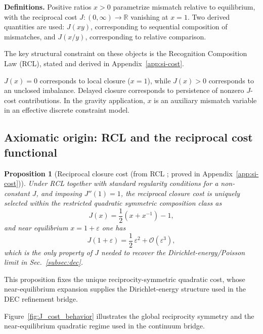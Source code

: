 \documentclass[entropy,article,submit,pdftex,moreauthors]{Definitions/mdpi}
\newtheorem{propositionX}[theoremX]{Proposition}
\begin{document}
\textbf{Definitions.} Positive ratios \(x>0\) parametrize mismatch relative to equilibrium, with the reciprocal cost \(J:(0,\infty)\to\mathbb{R}\) vanishing at \(x=1\). Two derived quantities are used: \(J(xy)\), corresponding to sequential composition of mismatches, and \(J(x/y)\), corresponding to relative comparison.

The key structural constraint on these objects is the Recognition Composition Law (RCL), stated and derived in Appendix~\ref{app:si-cost}.

\(J(x)=0\) corresponds to local closure (\(x=1\)), while \(J(x)>0\) corresponds to an unclosed imbalance. Delayed closure corresponds to persistence of nonzero \(J\)-cost contributions. In the gravity application, \(x\) is an auxiliary mismatch variable in an effective discrete constraint model.

\subsection{Axiomatic origin: RCL and the reciprocal cost functional}
\label{subsec:cost}

\begin{propositionX}
[Reciprocal closure cost (from RCL \cite{pardoguerra2026,washburn2026ratio}; proved in Appendix~\ref{app:si-cost})]
\label{dr:J}
Under RCL together with standard regularity conditions for a non-constant \(J\), and imposing \(J''(1)=1\), the reciprocal closure cost is uniquely selected within the restricted quadratic symmetric composition class as 
\begin{equation}
 J(x)=\frac12\left(x+x^{-1}\right)-1,
  \label{eq:J-closed-form-main}
\end{equation}
and near equilibrium \(x=1+\varepsilon\) one has
\begin{equation}
  J(1+\varepsilon)=\frac12\,\varepsilon^2+\mathcal{O}(\varepsilon^3),
  \label{eq:J-quadratic}
\end{equation}
which is the only property of \(J\) needed to recover the Dirichlet-energy/Poisson limit in Sec.~\ref{subsec:dec}.
\end{propositionX}
This proposition fixes the unique reciprocity-symmetric quadratic cost, whose near-equilibrium expansion supplies the Dirichlet-energy structure used in the DEC refinement bridge.

Figure~\ref{fig:J_cost_behavior} illustrates the global reciprocity symmetry and the near-equilibrium quadratic regime used in the continuum bridge.
\end{document}

